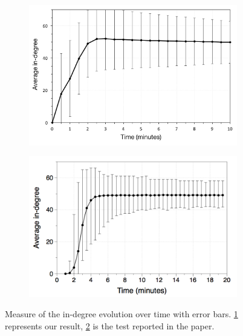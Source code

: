 \begin{figure}
\centering
\begin{subfigure}{.5\textwidth}
  \centering
  \includegraphics[keepaspectratio=true, width=1\linewidth]{images/indegree_evolution}
  \caption{}
  \label{fig:indegree_evolution}
\end{subfigure}%
\begin{subfigure}{.5\textwidth}
  \centering
  \includegraphics[keepaspectratio=true, width=1\linewidth]{images/paper_indegree_evolution}
  \caption{}
  \label{fig:paper_indegree_evolution}
\end{subfigure}
\caption{Measure of the in-degree evolution over time with error bars. \ref{fig:indegree_evolution} represents our result, \ref{fig:paper_indegree_evolution} is the test reported in the paper.}
\label{fig:randomness_indegree}
\end{figure}

